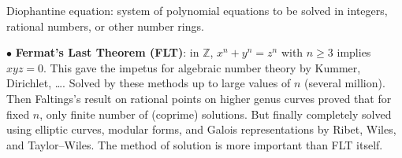 \documentclass[10pt,a4]{seminar}
\newcommand{\Z}{{\mathbb{Z}}}
\newcommand{\ctl}{\centerline}
\newcommand{\myblue}{\red}
\begin{document}
 


\begin{slide}
\ctl{\large{}\myblue{\sc Examples (I)}}

\medskip

Diophantine equation: system of polynomial equations to be solved in
{\red integers}, {\red rational numbers}, or other number rings.

\smallskip

{\red $\bullet$} {\bf Fermat's Last Theorem (FLT)}: in {\blue $\Z$},
{\blue $x^n+y^n=z^n$} with {\blue $n\ge3$} implies {\blue $xyz=0$}.
This gave the impetus for {\red algebraic number theory} by {\red
  Kummer}, {\red Dirichlet}, \dots. Solved by these methods up to
large values of {\blue $n$} (several million). Then {\red Faltings's}
result on rational points on higher genus curves proved that for
{\red fixed} {\blue $n$}, only finite number of (coprime) solutions.
But finally completely solved using {\red elliptic curves}, {\red
  modular forms}, and 
{\red Galois representations} by {\red Ribet}, {\red Wiles}, and 
{\red Taylor--Wiles}. The method of solution is more important than FLT itself.

\end{slide}
\end{document}
